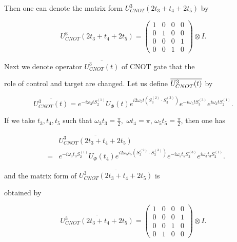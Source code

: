 Then one can denote the matrix form $U_{CNOT}^{3}(2t_{3}+t_{4}+2t_{5})$ by 

\[

U_{CNOT}^{3}(2t_{3}+t_{4}+2t_{5})=\left( 

\begin{array}{cccc}

1 & 0 & 0 & 0 \\ 

0 & 1 & 0 & 0 \\ 

0 & 0 & 0 & 1 \\ 

0 & 0 & 1 & 0%

\end{array}%

\right) \otimes I.

\]%

Next we denote operator $\overline{U_{CNOT}^{3}(t)}$ of CNOT gate that the

role of control and target are changed. Let us define $\overline{%

U_{CNOT}^{3}(t)}$ by 

\[

\overline{U_{CNOT}^{3}(t)}=e^{-i\omega _{3}tS_{2}^{(1)}}U_{\Phi

}(t)e^{i2\omega _{5}t(S_{3}^{(2)}\cdot S_{3}^{(3)})}e^{-i\omega

_{5}tS_{3}^{(3)}}e^{i\omega _{3}tS_{2}^{(1)}}.

\]%

If we take $t_{3},t_{4},t_{5}$ such that $\omega _{3}t_{3}=\frac{\pi }{2}%

,$ $\omega t_{4}=\pi$, $\omega _{5}t_{5}=\frac{\pi }{2}$, then one has 

\begin{eqnarray*}

&&\overline{U_{CNOT}^{3}(2t_{3}+t_{4}+2t_{5})} \\

&=&e^{-i\omega _{3}t_{3}S_{2}^{(1)}}U_{\Phi }(t_{4})e^{i2\omega

_{5}t_{5}(S_{3}^{(2)}\cdot S_{3}^{(3)})}e^{-i\omega

_{5}t_{5}S_{3}^{(3)}}e^{i\omega _{3}t_{3}S_{2}^{(1)}}.

\end{eqnarray*}%

and the matrix form of $\overline{U_{CNOT}^{3}(2t_{3}+t_{4}+2t_{5})}$ is

obtained by 

\[

\overline{U_{CNOT}^{3}(2t_{3}+t_{4}+2t_{5})}=\left( 

\begin{array}{cccc}

1 & 0 & 0 & 0 \\ 

0 & 0 & 0 & 1 \\ 

0 & 0 & 1 & 0 \\ 

0 & 1 & 0 & 0%

\end{array}%

\right) \otimes I.

\]%

